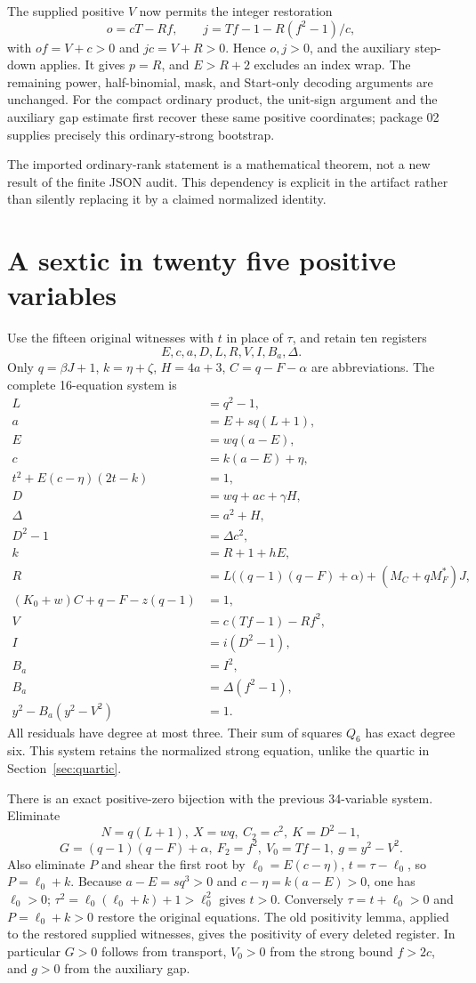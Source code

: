 \documentclass[11pt]{article}
\begin{document}
The supplied positive $V$ now permits the integer restoration
\[
o=cT-Rf,\qquad j=Tf-1-R(f^2-1)/c,
\]
with $of=V+c>0$ and $jc=V+R>0$. Hence $o,j>0$, and the auxiliary step-down applies. It gives $p=R$, and $E>R+2$ excludes an index wrap. The remaining power, half-binomial, mask, and Start-only decoding arguments are unchanged. For the compact ordinary product, the unit-sign argument and the auxiliary gap estimate first recover these same positive coordinates; package 02 supplies precisely this ordinary-strong bootstrap.

The imported ordinary-rank statement is a mathematical theorem, not a new result of the finite JSON audit. This dependency is explicit in the artifact rather than silently replacing it by a claimed normalized identity.

\section{A sextic in twenty five positive variables}\label{sec:sextic}

Use the fifteen original witnesses with $t$ in place of $\tau$, and retain ten registers
\[
E,c,a,D,L,R,V,I,B_a,\Delta.
\]
Only $q=\beta J+1$, $k=\eta+\zeta$, $H=4a+3$, $C=q-F-\alpha$ are abbreviations. The complete 16-equation system is
\begin{align}
L&=q^2-1,\\
a&=E+sq(L+1),\\
E&=wq(a-E),\\
c&=k(a-E)+\eta,\\
t^2+E(c-\eta)(2t-k)&=1,\\
D&=wq+ac+\gamma H,\\
\Delta&=a^2+H,\\
D^2-1&=\Delta c^2,\\
k&=R+1+hE,\\
R&=L\big((q-1)(q-F)+\alpha\big)+(M_C+qM_F^*)J,\\
(K_0+w)C+q-F-z(q-1)&=1,\\
V&=c(Tf-1)-Rf^2,\\
I&=i(D^2-1),\\
B_a&=I^2,\\
B_a&=\Delta(f^2-1),\\
y^2-B_a(y^2-V^2)&=1.
\end{align}
All residuals have degree at most three. Their sum of squares $Q_6$ has exact degree six. This system retains the normalized strong equation, unlike the quartic in Section~\ref{sec:quartic}.

There is an exact positive-zero bijection with the previous 34-variable system. Eliminate
\[
N=q(L+1),\ X=wq,\ C_2=c^2,\ K=D^2-1,
\]
\[
G=(q-1)(q-F)+\alpha,\ F_2=f^2,\ V_0=Tf-1,\ g=y^2-V^2.
\]
Also eliminate $P$ and shear the first root by
$\ell_0=E(c-\eta)$, $t=\tau-\ell_0$, so $P=\ell_0+k$.
Because $a-E=sq^3>0$ and $c-\eta=k(a-E)>0$, one has $\ell_0>0$;
$\tau^2=\ell_0(\ell_0+k)+1>\ell_0^2$ gives $t>0$.
Conversely $\tau=t+\ell_0>0$ and $P=\ell_0+k>0$ restore the original equations. The old positivity lemma, applied to the restored supplied witnesses, gives the positivity of every deleted register. In particular $G>0$ follows from transport, $V_0>0$ from the strong bound $f>2c$, and $g>0$ from the auxiliary gap.
\end{document}
